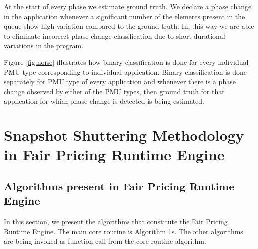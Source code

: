 \documentclass[pageno]{jpaper}
\begin{document}
At the start of every phase we estimate ground truth. We declare a phase change in the application whenever a significant number of the elements present in the queue show high variation compared to the ground truth. In, this way we are able to eliminate incorrect phase change classification due to short durational variations in the program.

Figure \ref{fig:noise} illustrates how binary classification is done for every individual PMU type corresponding to individual application. Binary classification is done separately for PMU type of every application and whenever there is a phase change observed by either of the PMU types, then ground truth for that application for which phase change is detected is being estimated.
\section{Snapshot Shuttering Methodology in Fair Pricing Runtime Engine}
\label{sec:SnapshotShutteringMethodologyinFairPricingRuntimeEngine}
\subsection{Algorithms present in Fair Pricing Runtime Engine}
\label{subsec:AlgorithmspresentinFairPricingRuntimeEngine}

In this section, we present the algorithms that constitute the Fair Pricing Runtime Engine. The main core routine is Algorithm 1s. The other algorithms are being invoked as function call from the core routine algorithm.
\end{document}
